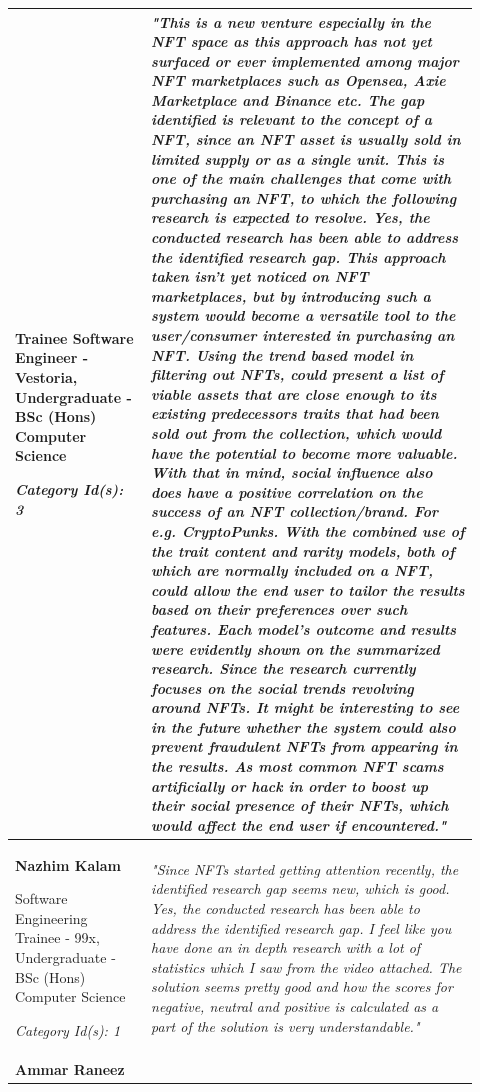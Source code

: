 \begin{longtable}{|p{0.27\linewidth}|p{0.655\linewidth}|}
Trainee Software Engineer - Vestoria,
Undergraduate - BSc (Hons) Computer Science

\textit{Category Id(s): 3}
 &
\textit{"This is a new venture especially in the NFT space as this approach has not yet surfaced or ever implemented among major NFT marketplaces such as Opensea, Axie Marketplace and Binance etc. The gap identified is relevant to the concept of a NFT, since an NFT asset is usually sold in limited supply or as a single unit. This is one of the main challenges that come with purchasing an NFT,  to which the following research is expected to resolve. Yes, the conducted research has been able to address the identified research gap. This approach taken isn’t yet noticed on NFT marketplaces, but by introducing such a system would become a versatile tool to the user/consumer interested in purchasing an NFT. 
Using the trend based model in filtering out NFTs, could present a list of viable assets that are close enough to its existing predecessors traits that had been sold out from the collection, which would have the potential to become more valuable. With that in mind, social influence also does have a positive correlation on the success of an NFT collection/brand. For e.g. CryptoPunks.
With the combined use of the trait content and rarity models, both of which are normally included on a NFT, could allow the end user to tailor the results based on their preferences over such features.
Each model's outcome and results were evidently shown on the summarized research.
Since the research currently focuses on the social trends revolving around NFTs. It might be interesting to see in the future whether the system could also prevent fraudulent NFTs from appearing in the results. As most common NFT scams artificially or hack in order to boost  up their social presence of their NFTs, which would affect the end user if encountered."}
 \\
\hline
\textbf{Nazhim Kalam}

Software Engineering Trainee - 99x,
Undergraduate - BSc (Hons) Computer Science

\textit{Category Id(s): 1}
 & 
 \textit{"Since NFTs started getting attention recently, the identified research gap seems new, which is good. Yes, the conducted research has been able to address the identified research gap. I feel like you have done an in depth research with a lot of statistics which I saw from the video attached. The solution seems pretty good and how the scores for negative, neutral and positive is calculated as a part of the solution is very understandable."}
 \\
\hline
\textbf{Ammar Raneez}


\end{longtable}
